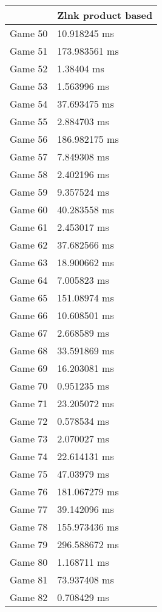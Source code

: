 \begin{multicols}{2}
\begin{tabular}{|l|l|}
	\hline
	& Zlnk product based \\ \hline
	Game 50 & 10.918245 ms \\ \hline
	Game 51 & 173.983561 ms \\ \hline
	Game 52 & 1.38404 ms \\ \hline
	Game 53 & 1.563996 ms \\ \hline
	Game 54 & 37.693475 ms \\ \hline
	Game 55 & 2.884703 ms \\ \hline
	Game 56 & 186.982175 ms \\ \hline
	Game 57 & 7.849308 ms \\ \hline
	Game 58 & 2.402196 ms \\ \hline
	Game 59 & 9.357524 ms \\ \hline
	Game 60 & 40.283558 ms \\ \hline
	Game 61 & 2.453017 ms \\ \hline
	Game 62 & 37.682566 ms \\ \hline
	Game 63 & 18.900662 ms \\ \hline
	Game 64 & 7.005823 ms \\ \hline
	Game 65 & 151.08974 ms \\ \hline
	Game 66 & 10.608501 ms \\ \hline
	Game 67 & 2.668589 ms \\ \hline
	Game 68 & 33.591869 ms \\ \hline
	Game 69 & 16.203081 ms \\ \hline
	Game 70 & 0.951235 ms \\ \hline
	Game 71 & 23.205072 ms \\ \hline
	Game 72 & 0.578534 ms \\ \hline
	Game 73 & 2.070027 ms \\ \hline
	Game 74 & 22.614131 ms \\ \hline
	Game 75 & 47.03979 ms \\ \hline
	Game 76 & 181.067279 ms \\ \hline
	Game 77 & 39.142096 ms \\ \hline
	Game 78 & 155.973436 ms \\ \hline
	Game 79 & 296.588672 ms \\ \hline
	Game 80 & 1.168711 ms \\ \hline
	Game 81 & 73.937408 ms \\ \hline
	Game 82 & 0.708429 ms \\ \hline

\end{tabular}
\end{multicols}
